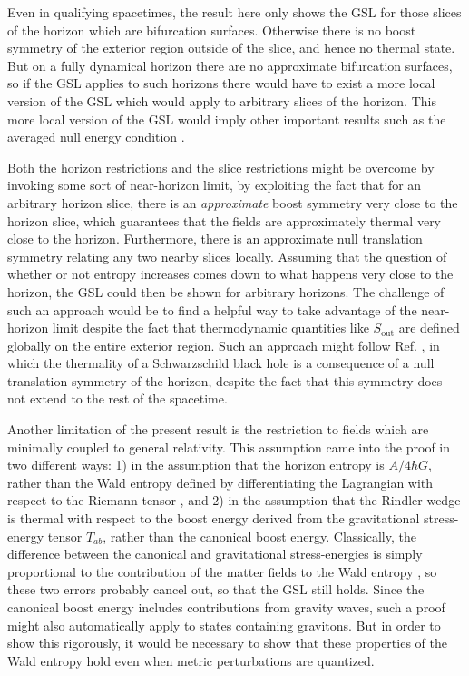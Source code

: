 \documentclass[12pt]{article}
\begin{document}
Even in qualifying spacetimes, the result here only shows the GSL for those slices of the horizon which are bifurcation surfaces.  Otherwise there is no boost symmetry of the exterior region outside of the slice, and hence no thermal state.  But on a fully dynamical horizon there are no approximate bifurcation surfaces, so if the GSL applies to such horizons there would have to exist a more local version of the GSL which would apply to arbitrary slices of the horizon.  This more local version of the GSL would imply other important results such as the averaged null energy condition \cite{anec}.

Both the horizon restrictions and the slice restrictions might be overcome by invoking some sort of near-horizon limit, by exploiting the fact that for an arbitrary horizon slice, there is an \emph{approximate} boost symmetry very close to the horizon slice, which guarantees that the fields are approximately thermal very close to the horizon.  Furthermore, there is an approximate null translation symmetry relating any two nearby slices locally.  Assuming that the question of whether or not entropy increases comes down to what happens very close to the horizon, the GSL could then be shown for arbitrary horizons.  The challenge of such an approach would be to find a helpful way to take advantage of the near-horizon limit despite the fact that thermodynamic quantities like $S_\mathrm{out}$ are defined globally on the entire exterior region.  Such an approach might follow Ref. \cite{sewell81}, in which the thermality of a Schwarzschild black hole is a consequence of a null translation symmetry of the horizon, despite the fact that this symmetry does not extend to the rest of the spacetime.

Another limitation of the present result is the restriction to fields which are minimally coupled to general relativity.  This assumption came into the proof in two different ways:  
1) in the assumption that the horizon entropy is $A/{4\hbar G}$, rather than the Wald entropy defined by differentiating the Lagrangian with respect to the Riemann tensor \cite{WI94}, and 2) in the assumption that the Rindler wedge is thermal with respect to the boost energy derived from the gravitational stress-energy tensor $T_{ab}$, rather than the canonical boost energy.  Classically, the difference between the canonical and gravitational stress-energies is simply proportional to the contribution of the matter fields to the Wald entropy \cite{fursaev99}, so these two errors probably cancel out, so that the GSL still holds.  Since the canonical boost energy includes contributions from gravity waves, such a proof might also automatically apply to states containing gravitons.  But in order to show this rigorously, it would be necessary to show that these properties of the Wald entropy hold even when metric perturbations are quantized.
\end{document}
